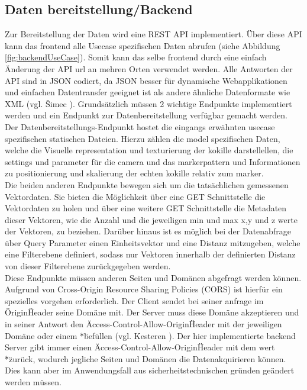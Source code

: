 \subsection{Daten bereitstellung/Backend}

Zur Bereitstellung der Daten wird eine REST API implementiert. Über diese API kann das frontend alle Usecase spezifischen Daten abrufen (siehe Abbildung \ref{fig:backendUseCase}). Somit kann das selbe frontend durch eine einfach Änderung der API url an mehren Orten verwendet werden. Alle Antworten der API sind in JSON codiert, da JSON besser für dynamische Webapplikationen und einfachen Datentransfer geeignet ist als andere ähnliche Datenformate wie XML (vgl. Šimec \cite{comparisonJsonXml}).
Grundsätzlich müssen 2 wichtige Endpunkte implementiert werden und ein Endpunkt zur Datenbereitstellung verfügbar gemacht werden.\\
Der Datenbereitstellungs-Endpunkt hostet die eingangs erwähnten usecase spezifischen statischen Dateien. Hierzu zählen die model spezifischen Daten, welche die Visuelle representation und texturierung der kokille darstellellen, die settings und parameter für die camera und das markerpattern und Informationen zu positionierung und skalierung der echten kokille relativ zum marker.\\
Die beiden anderen Endpunkte bewegen sich um die tatsächlichen gemessenen Vektordaten. Sie bieten die Möglichkeit über eine GET Schnittstelle die Vektordaten zu holen und über eine weitere GET Schnittstelle die Metadaten dieser Vektoren, wie die Anzahl und die jeweiligen min und max x,y und z werte der Vektoren, zu beziehen. Darüber hinaus ist es möglich bei der Datenabfrage über Query Parameter einen Einheitsvektor und eine Distanz mitzugeben, welche eine Filterebene definiert, sodass nur Vektoren innerhalb der definierten Distanz von dieser Filterebene zurückgegeben werden.\\
Diese Endpunkte müssen anderen Seiten und Domänen abgefragt werden können. Aufgrund von Cross-Origin Resource Sharing Policies (CORS) ist hierfür ein spezielles vorgehen erforderlich. Der Client sendet bei seiner anfrage im \"Origin\" Header seine Domäne mit. Der Server muss diese Domäne akzeptieren und in seiner Antwort den \"Access-Control-Allow-Origin\" Header mit der jeweiligen Domäne oder einem \"*\" befüllen (vgl. Kesteren \cite{van2014cross}). Der hier implementierte backend Server gibt immer einen \"Access-Control-Allow-Origin\" Header mit dem wert \"*\" zurück, wodurch jegliche Seiten und Domänen die Datenakquirieren können. Dies kann aber im Anwendungsfall aus sicherheitstechnischen gründen geändert werden müssen.

